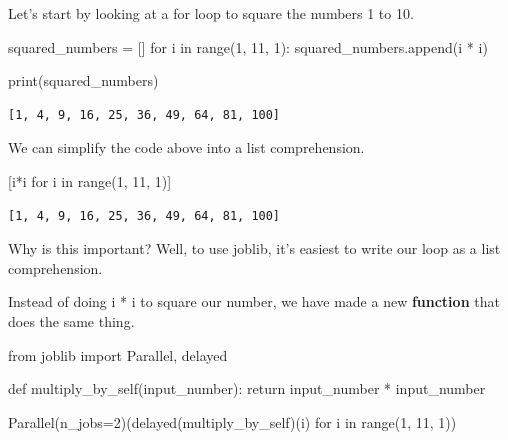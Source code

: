 \documentclass[
  letterpaper,
  DIV=11,
  numbers=noendperiod]{scrreprt}
\newenvironment{Shaded}{\begin{snugshade}}{\end{snugshade}}
\newcommand{\BuiltInTok}[1]{\textcolor[rgb]{0.00,0.23,0.31}{#1}}
\newcommand{\ControlFlowTok}[1]{\textcolor[rgb]{0.00,0.23,0.31}{#1}}
\newcommand{\DecValTok}[1]{\textcolor[rgb]{0.68,0.00,0.00}{#1}}
\newcommand{\ImportTok}[1]{\textcolor[rgb]{0.00,0.46,0.62}{#1}}
\newcommand{\KeywordTok}[1]{\textcolor[rgb]{0.00,0.23,0.31}{#1}}
\newcommand{\NormalTok}[1]{\textcolor[rgb]{0.00,0.23,0.31}{#1}}
\newcommand{\OperatorTok}[1]{\textcolor[rgb]{0.37,0.37,0.37}{#1}}
\begin{document}
Let's start by looking at a for loop to square the numbers 1 to 10.

\begin{Shaded}
\begin{Highlighting}[]
\NormalTok{squared\_numbers }\OperatorTok{=}\NormalTok{ []}
\ControlFlowTok{for}\NormalTok{ i }\KeywordTok{in} \BuiltInTok{range}\NormalTok{(}\DecValTok{1}\NormalTok{, }\DecValTok{11}\NormalTok{, }\DecValTok{1}\NormalTok{):}
\NormalTok{  squared\_numbers.append(i }\OperatorTok{*}\NormalTok{ i)}

\BuiltInTok{print}\NormalTok{(squared\_numbers)}
\end{Highlighting}
\end{Shaded}

\begin{verbatim}
[1, 4, 9, 16, 25, 36, 49, 64, 81, 100]
\end{verbatim}

We can simplify the code above into a list comprehension.

\begin{Shaded}
\begin{Highlighting}[]
\NormalTok{[i}\OperatorTok{*}\NormalTok{i }\ControlFlowTok{for}\NormalTok{ i }\KeywordTok{in} \BuiltInTok{range}\NormalTok{(}\DecValTok{1}\NormalTok{, }\DecValTok{11}\NormalTok{, }\DecValTok{1}\NormalTok{)]}
\end{Highlighting}
\end{Shaded}

\begin{verbatim}
[1, 4, 9, 16, 25, 36, 49, 64, 81, 100]
\end{verbatim}

Why is this important? Well, to use joblib, it's easiest to write our
loop as a list comprehension.

Instead of doing i * i to square our number, we have made a new
\textbf{function} that does the same thing.

\begin{Shaded}
\begin{Highlighting}[]
\ImportTok{from}\NormalTok{ joblib }\ImportTok{import}\NormalTok{ Parallel, delayed}

\KeywordTok{def}\NormalTok{ multiply\_by\_self(input\_number):}
  \ControlFlowTok{return}\NormalTok{ input\_number }\OperatorTok{*}\NormalTok{ input\_number}

\NormalTok{Parallel(n\_jobs}\OperatorTok{=}\DecValTok{2}\NormalTok{)(delayed(multiply\_by\_self)(i) }\ControlFlowTok{for}\NormalTok{ i }\KeywordTok{in} \BuiltInTok{range}\NormalTok{(}\DecValTok{1}\NormalTok{, }\DecValTok{11}\NormalTok{, }\DecValTok{1}\NormalTok{))}
\end{Highlighting}
\end{Shaded}
\end{document}
